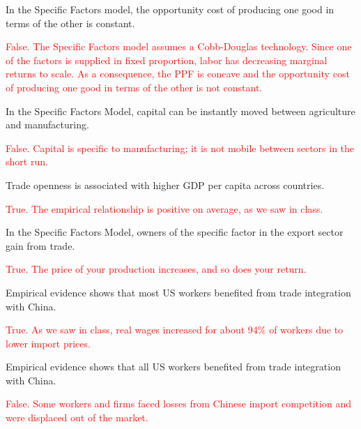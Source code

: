 \documentclass[11pt,letterpaper]{exam}
\newcommand{\red}[1]{\textcolor{red}{#1}}
\begin{document}
\begin{questions}
\question In the Specific Factors model, the opportunity cost of producing one good in terms of the other is constant.

\red{False. The Specific Factors model assumes a Cobb-Douglas technology. Since one of the factors is supplied in fixed proportion, labor has decreasing marginal returns to scale. As a consequence, the PPF is concave and the opportunity cost of producing one good in terms of the other is not constant.}





\question In the Specific Factors Model, capital can be instantly moved between agriculture and manufacturing.

\red{False. Capital is specific to manufacturing; it is not mobile between sectors in the short run.}

\question Trade openness is associated with higher GDP per capita across countries.

\red{True. The empirical relationship is positive on average, as we saw in class.}



\question In the Specific Factors Model, owners of the specific factor in the export sector gain from trade.

\red{True. The price of your production increases, and so does your return.}

\question Empirical evidence shows that most US workers benefited from trade integration with China.

\red{True. As we saw in class, real wages increased for about 94\% of workers due to lower import prices.}

\question Empirical evidence shows that all US workers benefited from trade integration with China.

\red{False. Some workers and firms faced losses from Chinese import competition and were displaced out of the market.}

\end{questions}
\end{document}
